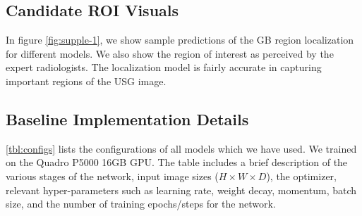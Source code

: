 \subsection{Candidate ROI Visuals}
\label{supp:roi_vis}
In figure \ref{fig:supple-1}, we show sample predictions of the GB region localization for different models. We also show the region of interest as perceived by the expert radiologists. The localization model is fairly accurate in capturing important regions of the USG image.

\subsection{Baseline Implementation Details}
%

\label{supp:impl}
\cref{tbl:configs} lists the configurations of all models which we have used. We trained on the Quadro P5000 16GB GPU. The table includes a brief description of the various stages of the network, input image sizes ($H\times W\times D$), the optimizer, relevant hyper-parameters such as learning rate, weight decay, momentum, batch size, and the number of training epochs/steps for the network. 
